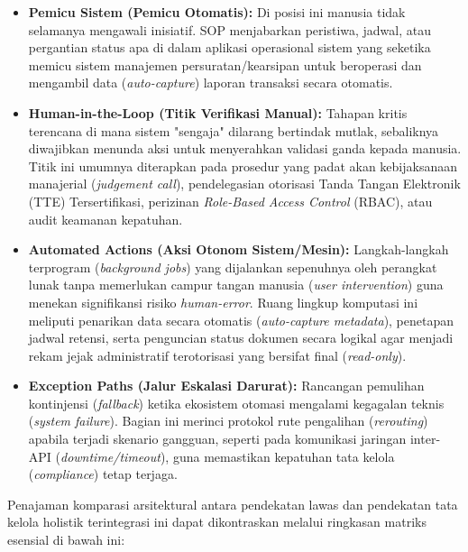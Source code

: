 \documentclass[12pt,a4paper]{report}
\begin{document}
\begin{itemize}[leftmargin=*]
    \item \textbf{Pemicu Sistem (Pemicu Otomatis):} Di posisi ini manusia tidak selamanya mengawali inisiatif. SOP menjabarkan peristiwa, jadwal, atau pergantian status apa di dalam aplikasi operasional sistem yang seketika memicu sistem manajemen persuratan/kearsipan untuk beroperasi dan mengambil data (\textit{auto-capture}) laporan transaksi secara otomatis.
    \item \textbf{Human-in-the-Loop (Titik Verifikasi Manual):} Tahapan kritis terencana di mana sistem "sengaja" dilarang bertindak mutlak, sebaliknya diwajibkan menunda aksi untuk menyerahkan validasi ganda kepada manusia. Titik ini umumnya diterapkan pada prosedur yang padat akan kebijaksanaan manajerial (\textit{judgement call}), pendelegasian otorisasi Tanda Tangan Elektronik (TTE) Tersertifikasi, perizinan \textit{Role-Based Access Control} (RBAC), atau audit keamanan kepatuhan.
    \item \textbf{Automated Actions (Aksi Otonom Sistem/Mesin):} Langkah-langkah terprogram (\textit{background jobs}) yang dijalankan sepenuhnya oleh perangkat lunak tanpa memerlukan campur tangan manusia (\textit{user intervention}) guna menekan signifikansi risiko \textit{human-error}. Ruang lingkup komputasi ini meliputi penarikan data secara otomatis (\textit{auto-capture metadata}), penetapan jadwal retensi, serta penguncian status dokumen secara logikal agar menjadi rekam jejak administratif terotorisasi yang bersifat final (\textit{read-only}).
    \item \textbf{Exception Paths (Jalur Eskalasi Darurat):} Rancangan pemulihan kontinjensi (\textit{fallback}) ketika ekosistem otomasi mengalami kegagalan teknis (\textit{system failure}). Bagian ini merinci protokol rute pengalihan (\textit{rerouting}) apabila terjadi skenario gangguan, seperti pada komunikasi jaringan inter-API (\textit{downtime/timeout}), guna memastikan kepatuhan tata kelola (\textit{compliance}) tetap terjaga.
\end{itemize}

Penajaman komparasi arsitektural antara pendekatan lawas dan pendekatan tata kelola holistik terintegrasi ini dapat dikontraskan melalui ringkasan matriks esensial di bawah ini:
\end{document}
